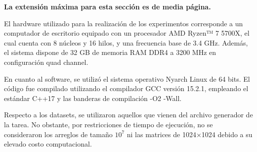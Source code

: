 \begin{mdframed}
    \textbf{La extensión máxima para esta sección es de media página.}
\end{mdframed}
El hardware utilizado para la realización de los experimentos corresponde a un computador de escritorio equipado con un procesador AMD Ryzen™ 7 5700X, el cual cuenta con 8 núcleos y 16 hilos, y una frecuencia base de 3.4 GHz. Además, el sistema dispone de 32 GB de memoria RAM DDR4 a 3200 MHz en configuración quad channel.

En cuanto al software, se utilizó el sistema operativo Nyarch Linux de 64 bits. El código fue compilado utilizando el compilador GCC versión 15.2.1, empleando el estándar C++17 y las banderas de compilación -O2 -Wall.

Respecto a los datasets, se utilizaron aquellos que vienen del archivo generador de la tarea. No obstante, por restricciones de tiempo de ejecución, no se consideraron los arreglos de tamaño 
$10^7$ ni las matrices de 1024×1024 debido a su elevado costo computacional.
\newpage